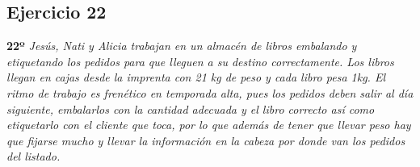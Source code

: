 \documentclass{article}
\begin{document}
      \subsection{Ejercicio 22}

        \textbf{22º} \textit{Jesús, Nati y Alicia trabajan en un almacén de libros embalando y etiquetando los pedidos para que lleguen a su destino correctamente. Los libros llegan en 
        cajas desde la imprenta con 21 kg de peso y cada libro pesa 1kg. El ritmo de trabajo es frenético en temporada alta, pues los pedidos deben salir al día siguiente, embalarlos con la 
        cantidad adecuada y el libro correcto así como etiquetarlo con el cliente que toca, por lo que además de tener que llevar peso hay que fijarse mucho y llevar la información en la cabeza
        por donde van los pedidos del listado.}
\end{document}

